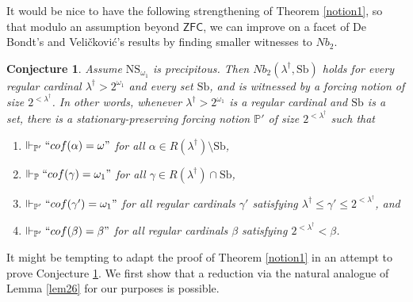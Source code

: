 \documentclass[12pt, twoside]{memoir}
\numberwithin{equation}{section}
\newtheorem{conj}[thm]{Conjecture}
\theoremstyle{definition}
\theoremstyle{remark}
\theoremstyle{definition}
\theoremstyle{definition}
\theoremstyle{definition}
\theoremstyle{remark}
\begin{document}
It would be nice to have the following strengthening of Theorem \ref{notion1}, so that modulo an assumption beyond $\mathsf{ZFC}$, we can improve on a facet of De Bondt's and Veli\v{c}kovi\'{c}'s results by finding smaller witnesses to $Nb_2$.

\begin{conj}\label{notion4}
Assume $\mathrm{NS}_{\omega_1}$ is precipitous. Then $Nb_2(\lambda^{\dagger}, \mathrm{Sb})$ holds for every regular cardinal $\lambda^{\dagger} > 2^{\omega_1}$ and every set $\mathrm{Sb}$, and is witnessed by a forcing notion of size $2^{< \lambda^{\dagger}}$. In other words, whenever $\lambda^{\dagger} > 2^{\omega_1}$ is a regular cardinal and $\mathrm{Sb}$ is a set, there is a stationary-preserving forcing notion $\mathbb{P}'$ of size $2^{< \lambda^{\dagger}}$ such that 
\begin{enumerate}[label=(\arabic*)]
    \item\label{cond1+} $\Vdash_{\mathbb{P}'} ``cof(\alpha) = \omega"$ for all $\alpha \in R(\lambda^{\dagger}) \setminus \mathrm{Sb}$,
    \item\label{cond2+} $\Vdash_{\mathbb{P}} ``cof(\gamma) = \omega_1"$ for all $\gamma \in R(\lambda^{\dagger}) \cap \mathrm{Sb}$,
    \item $\Vdash_{\mathbb{P}'} ``cof(\gamma') = \omega_1"$ for all regular cardinals $\gamma'$ satisfying $\lambda^{\dagger} \leq \gamma' \leq 2^{< \lambda^{\dagger}}$, and
    \item\label{cond4+} $\Vdash_{\mathbb{P}'} ``cof(\beta) = \beta"$ for all regular cardinals $\beta$ satisfying $2^{< \lambda^{\dagger}} < \beta$.
\end{enumerate}
\end{conj}

It might be tempting to adapt the proof of Theorem \ref{notion1} in an attempt to prove Conjecture \ref{notion4}. We first show that a reduction via the natural analogue of Lemma \ref{lem26} for our purposes is possible. 
\end{document}
